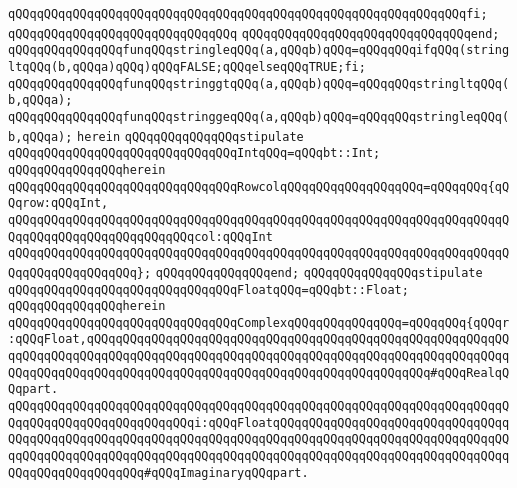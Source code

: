\verb|qQQqqQQqqQQqqQQqqQQqqQQqqQQqqQQqqQQqqQQqqQQqqQQqqQQqqQQqqQQqqQQqfi;|\newline
\verb|qQQqqQQqqQQqqQQqqQQqqQQqqQQqqQQq|\newline
\verb|qQQqqQQqqQQqqQQqqQQqqQQqqQQqqQQqend;|\newline
\newline
\verb|qQQqqQQqqQQqqQQqfunqQQqstringleqQQq(a,qQQqb)qQQq=qQQqqQQqifqQQq(stringltqQQq(b,qQQqa)qQQq)qQQqFALSE;qQQqelseqQQqTRUE;fi;|\newline
\verb|qQQqqQQqqQQqqQQqfunqQQqstringgtqQQq(a,qQQqb)qQQq=qQQqqQQqstringltqQQq(b,qQQqa);|\newline
\verb|qQQqqQQqqQQqqQQqfunqQQqstringgeqQQq(a,qQQqb)qQQq=qQQqqQQqstringleqQQq(b,qQQqa);|\newline
\newline
\verb|herein|\newline
\newline
\verb|qQQqqQQqqQQqqQQqstipulate|\newline
\verb|qQQqqQQqqQQqqQQqqQQqqQQqqQQqqQQqIntqQQq=qQQqbt::Int;|\newline
\verb|qQQqqQQqqQQqqQQqherein|\newline
\verb|qQQqqQQqqQQqqQQqqQQqqQQqqQQqqQQqRowcolqQQqqQQqqQQqqQQqqQQq=qQQqqQQq{qQQqrow:qQQqInt,|\newline
\verb|qQQqqQQqqQQqqQQqqQQqqQQqqQQqqQQqqQQqqQQqqQQqqQQqqQQqqQQqqQQqqQQqqQQqqQQqqQQqqQQqqQQqqQQqqQQqqQQqcol:qQQqInt|\newline
\verb|qQQqqQQqqQQqqQQqqQQqqQQqqQQqqQQqqQQqqQQqqQQqqQQqqQQqqQQqqQQqqQQqqQQqqQQqqQQqqQQqqQQqqQQq};|\newline
\verb|qQQqqQQqqQQqqQQqend;|\newline
\newline
\verb|qQQqqQQqqQQqqQQqstipulate|\newline
\verb|qQQqqQQqqQQqqQQqqQQqqQQqqQQqqQQqFloatqQQq=qQQqbt::Float;|\newline
\verb|qQQqqQQqqQQqqQQqherein|\newline
\verb|qQQqqQQqqQQqqQQqqQQqqQQqqQQqqQQqComplexqQQqqQQqqQQqqQQq=qQQqqQQq{qQQqr:qQQqFloat,qQQqqQQqqQQqqQQqqQQqqQQqqQQqqQQqqQQqqQQqqQQqqQQqqQQqqQQqqQQqqQQqqQQqqQQqqQQqqQQqqQQqqQQqqQQqqQQqqQQqqQQqqQQqqQQqqQQqqQQqqQQqqQQqqQQqqQQqqQQqqQQqqQQqqQQqqQQqqQQqqQQqqQQqqQQqqQQqqQQqqQQqqQQq#qQQqRealqQQqpart.|\newline
\verb|qQQqqQQqqQQqqQQqqQQqqQQqqQQqqQQqqQQqqQQqqQQqqQQqqQQqqQQqqQQqqQQqqQQqqQQqqQQqqQQqqQQqqQQqqQQqqQQqi:qQQqFloatqQQqqQQqqQQqqQQqqQQqqQQqqQQqqQQqqQQqqQQqqQQqqQQqqQQqqQQqqQQqqQQqqQQqqQQqqQQqqQQqqQQqqQQqqQQqqQQqqQQqqQQqqQQqqQQqqQQqqQQqqQQqqQQqqQQqqQQqqQQqqQQqqQQqqQQqqQQqqQQqqQQqqQQqqQQqqQQqqQQqqQQqqQQqqQQq#qQQqImaginaryqQQqpart.|\newline
